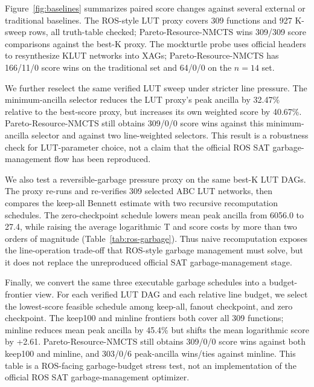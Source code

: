 \documentclass[11pt]{article}
\newcommand{\method}{Resource-NMCTS}
\begin{document}
Figure~\ref{fig:baselines} summarizes paired score changes against several
external or traditional baselines.  The ROS-style LUT proxy covers 309
functions and 927 K-sweep rows, all truth-table checked; Pareto-\method{} wins
309/309 score comparisons against the best-K proxy.  The mockturtle probe uses
official headers to resynthesize KLUT networks into XAGs; Pareto-\method{} has
166/11/0 score wins on the traditional set and 64/0/0 on the $n=14$ set.

We further reselect the same verified LUT sweep under stricter line pressure.
The minimum-ancilla selector reduces the LUT proxy's peak ancilla by 32.47\%
relative to the best-score proxy, but increases its own weighted score by
40.67\%.  Pareto-\method{} still obtains 309/0/0 score wins against this
minimum-ancilla selector and against two line-weighted selectors.  This result
is a robustness check for LUT-parameter choice, not a claim that the official
ROS SAT garbage-management flow has been reproduced.

\begin{table}[H]
\centering
\small
\caption{Line-aware reselection of the verified ROS-style LUT proxy sweep.}
\label{tab:ros-line}

\end{table}

We also test a reversible-garbage pressure proxy on the same best-K LUT DAGs.
The proxy re-runs and re-verifies 309 selected ABC LUT networks, then compares
the keep-all Bennett estimate with two recursive recomputation schedules.  The
zero-checkpoint schedule lowers mean peak ancilla from 6056.0 to 27.4, while
raising the average logarithmic T and score costs by more than two orders of
magnitude (Table~\ref{tab:ros-garbage}).  Thus naive recomputation exposes the
line-operation trade-off that ROS-style garbage management must solve, but it
does not replace the unreproduced official SAT garbage-management stage.

\begin{table}[H]
\centering
\small
\caption{ROS-style LUT garbage-management proxy over the verified best-K LUT
DAGs.  Logarithms are row-wise means over 309 functions; lower peak ancilla is
reported together with the operation blow-up.}
\label{tab:ros-garbage}

\end{table}

Finally, we convert the same three executable garbage schedules into a
budget-frontier view.  For each verified LUT DAG and each relative line budget,
we select the lowest-score feasible schedule among keep-all, fanout checkpoint,
and zero checkpoint.  The keep100 and minline frontiers both cover all 309
functions; minline reduces mean peak ancilla by 45.4\% but shifts the mean
logarithmic score by +2.61.  Pareto-\method{} still obtains 309/0/0 score wins
against both keep100 and minline, and 303/0/6 peak-ancilla wins/ties against
minline.  This table is a ROS-facing garbage-budget stress test, not an
implementation of the official ROS SAT garbage-management optimizer.
\end{document}
